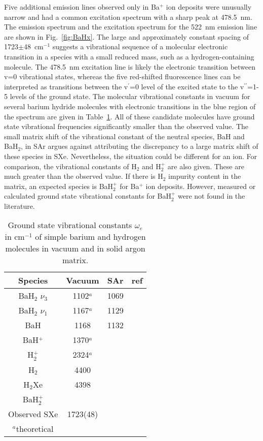 \documentclass[aps,pra,reprint,superscriptaddress]{revtex4-1}
\begin{document}
Five additional emission lines observed only in Ba$^+ $ ion deposits were unusually narrow and had a common excitation spectrum with a sharp peak at 478.5~nm.  
The emission spectrum and the excitation spectrum for the 522~nm emission line are shown in Fig.~\ref{fig:BaHx}.  
The large and approximately constant spacing of 1723$\pm $48~cm$^{-1}$ suggests a vibrational sequence of a molecular electronic transition in a species with a small reduced mass, such as a hydrogen-containing molecule.  
The 478.5~nm excitation line is likely the electronic transition between v=0 vibrational states, whereas the five red-shifted fluorescence lines can be interpreted as transitions between the v$^\prime$=0 level of the excited state to the v$^{\prime\prime}$=1-5 levels of the ground state.  
The molecular vibrational constants in vacuum for several barium hydride molecules with electronic transitions in the blue region of the spectrum are given in Table~\ref{tab:BaH_table}.
All of these candidate molecules have ground state vibrational frequencies significantly smaller than the observed value.
The small matrix shift of the vibrational constant of the neutral species, BaH and BaH$_2$, in SAr argues against attributing the discrepancy to a large matrix shift of these species in SXe.
Nevertheless, the situation could be different for an ion.
For comparison, the vibrational constants of  H$_2$ and H$_2^+$ are also given.
These are much greater than the observed value.  
If there is H$_2$ impurity content in the matrix, an expected species is BaH$_2^+$ for Ba$^+ $ ion deposits.  
However, measured or calculated ground state vibrational constants for BaH$_2^+ $ were not found in the literature.



\begin{table}[h!bt]
 \begin{ruledtabular}

	\caption{Ground state vibrational constants $\omega_e$ in cm$^{-1}$ of simple barium and hydrogen molecules in vacuum and in solid argon matrix.}
	\label{tab:BaH_table}
	\begin{center}
	\begin{tabular}{c c c c}
	Species & Vacuum & SAr & ref\\
	\hline
	BaH$_2$ $\nu_3$ & 1102$^a$ & 1069 &\cite{Wang2004}\\
	BaH$_2$ $\nu_1$ & 1167$^a$ & 1129 &\cite{Wang2004}\\
	BaH &1168 & 1132 &\cite{Magg1988, Wang2004}\\
	BaH$^{+}$ & 1370$^a$ & & \cite{Allouche1993}\\
	H$_2^{+}$ & 2324$^a$ & &\cite{Beckel1970} \\
	H$_2$ & 4400 & &\cite{Herzberg1959}\\
	H$_2$Xe & 4398 & &\cite{McKellar1971}\\
	BaH$_2^{+}$ & & &\\
	\hline
	Observed SXe &  1723(48) & &\\
	\hline
	$^a$theoretical
	\end{tabular}
	\end{center}
\end{ruledtabular}
\end{table}
\end{document}
